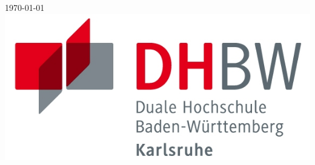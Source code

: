 \begin{titlepage}


{\large \today} %
\\[1cm]

\includegraphics{dhbwlogo}\\[1cm] %
 

\vfill %


\end{titlepage}